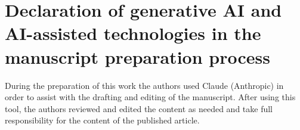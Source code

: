 \documentclass[preprint,authoryear,12pt]{elsarticle}
\theoremstyle{definition}
\theoremstyle{remark}
\begin{document}
\section*{Declaration of generative AI and AI-assisted technologies
in the manuscript preparation process}
During the preparation of this work the authors used Claude
(Anthropic) in order to assist with the drafting and editing of the
manuscript. After using this tool, the authors reviewed and edited
the content as needed and take full responsibility for the content of
the published article.



\end{document}
